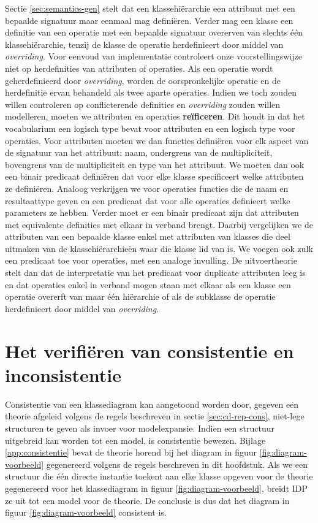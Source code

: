 Sectie \ref{sec:semantics-gen} stelt dat een klassehi\"erarchie een attribuut met een bepaalde signatuur maar eenmaal mag defini\"eren. Verder mag een klasse een definitie van een operatie met een bepaalde signatuur overerven van slechts \'e\'en klassehi\"erarchie, tenzij de klasse de operatie herdefinieert door middel van \textit{overriding}. Voor eenvoud van implementatie controleert onze voorstellingswijze niet op herdefinities van attributen of operaties. Als een operatie wordt geherdefinieerd door \textit{overriding}, worden de oorspronkelijke operatie en de herdefinitie ervan behandeld als twee aparte operaties. Indien we toch zouden willen controleren op conflicterende definities en \textit{overriding} zouden willen modelleren, moeten we attributen en operaties \textbf{re\"ificeren}. Dit houdt in dat het vocabularium een logisch type bevat voor attributen en een logisch type voor operaties. Voor attributen moeten we dan functies defini\"eren voor elk aspect van de signatuur van het attribuut: naam, ondergrens van de multipliciteit, bovengrens van de multipliciteit en type van het attribuut. We moeten dan ook een binair predicaat defini\"eren dat voor elke klasse specificeert welke attributen ze defini\"eren. Analoog verkrijgen we voor operaties functies die de naam en resultaattype geven en een predicaat dat voor alle operaties definieert welke parameters ze hebben. Verder moet er een binair predicaat zijn dat attributen met equivalente definities met elkaar in verband brengt. Daarbij vergelijken we de attributen van een bepaalde klasse enkel met attributen van klasses die deel uitmaken van de klassehi\"erarchie\"en waar die klasse lid van is. We voegen ook zulk een predicaat toe voor operaties, met een analoge invulling. De uitvoertheorie stelt dan dat de interpretatie van het predicaat voor duplicate attributen leeg is en dat operaties enkel in verband mogen staan met elkaar als een klasse een operatie overerft van maar \'e\'en hi\"erarchie of als de subklasse de operatie herdefinieert door middel van \textit{overriding}.

\section{Het verifi\"eren van consistentie en inconsistentie}

Consistentie van een klassediagram kan aangetoond worden door, gegeven een theorie afgeleid volgens de regels beschreven in sectie \ref{sec:cd-rep-cons}, niet-lege structuren te geven als invoer voor modelexpansie. Indien een structuur uitgebreid kan worden tot een model, is consistentie bewezen. Bijlage \ref{app:consistentie} bevat de theorie horend bij het diagram in figuur \ref{fig:diagram-voorbeeld} gegenereerd volgens de regels beschreven in dit hoofdstuk. Als we een structuur die \'e\'en directe instantie toekent aan elke klasse opgeven voor de theorie gegenereerd voor het klassediagram in figuur \ref{fig:diagram-voorbeeld}, breidt IDP ze uit tot een model voor de theorie. De conclusie is dus dat het diagram in figuur \ref{fig:diagram-voorbeeld} consistent is.

